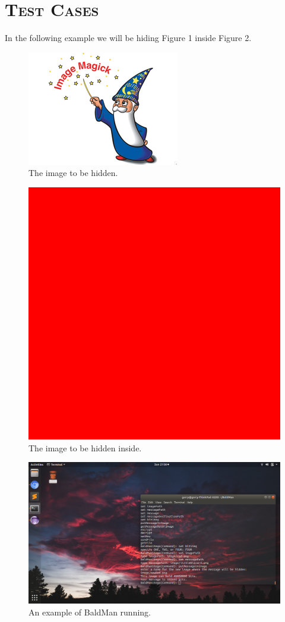 \documentclass[12pt]{article}
\begin{document}
	\section[Test Cases]{\Large{}\selectfont\scshape Test Cases}
	
	In the following example we will be hiding Figure 1 inside Figure 2.
	\begin{figure}[h!]
		\centering
		\includegraphics[keepaspectratio=true, width=0.3\linewidth]{image/littleWizzard.png}
		\caption{The image to be hidden.}
	\end{figure}

	\begin{figure}[h!]
		\centering
		\includegraphics[keepaspectratio=true, width=0.3\linewidth]{image/red.png}
		\caption{The image to be hidden inside.}
	\end{figure}
	
	\begin{figure}[h!]
		\centering
		\includegraphics[keepaspectratio=true, width=0.8\linewidth]{screenshot.png}
		\caption{An example of BaldMan running.}
	\end{figure}
	
	\clearpage
\end{document}
